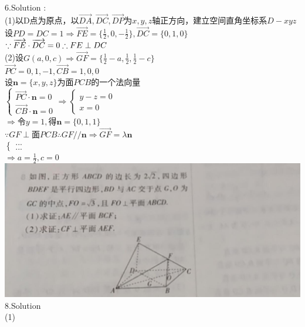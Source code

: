 \documentclass[a4paper,11pt,UTF8]{article}
\title{}
\author{}
\begin{document}
\noindent
6.Solution :\\
(1)以D点为原点，以$\overrightarrow{DA},\overrightarrow{DC},\overrightarrow{DP}$为$x,y,z$轴正方向，建立空间直角坐标系$D-xyz$\\
设$\displaystyle PD=DC=1\Rightarrow\overrightarrow{FE}=\{\frac{1}{2},0,-\frac{1}{2}\},\overrightarrow{DC}=\{0,1,0\}$\\
$\because\overrightarrow{FE}\cdot\overrightarrow{DC}=0\\\therefore FE\perp  DC$\\
(2)设$\displaystyle G(a,0,c)\Rightarrow\overrightarrow{GF}=\{\frac{1}{2}-a,\frac{1}{2},\frac{1}{2}-c\}$\\
$\overrightarrow{PC}={0,1,-1},\overrightarrow{CB}={1,0,0}$\\
设$\mathbf{n}=\{x,y,z\}$为面$PCB$的一个法向量\\
$\begin{cases}
	\overrightarrow{PC}\cdot\mathbf{n}=0\\
	\overrightarrow{CB}\cdot\mathbf{n}=0
\end{cases}\Rightarrow
\begin{cases}
	y-z=0\\
	x=0
\end{cases}
$\\
$\Rightarrow\text{令}y=1,\text{得}\mathbf{n}=\{0,1,1\}$\\
$\because GF\perp \text{面}PCB\therefore GF//\mathbf{n}\Rightarrow\overrightarrow{GF}=\lambda\mathbf{n}$\\
$\begin{cases}
	...\\
	...
\end{cases}$\\
$\displaystyle\Rightarrow a=\frac{1}{2}, c=0$\\
\includegraphics[scale=0.5]{./P14T8.jpg}\\
8.Solution\\
(1)\\
\end{document}
